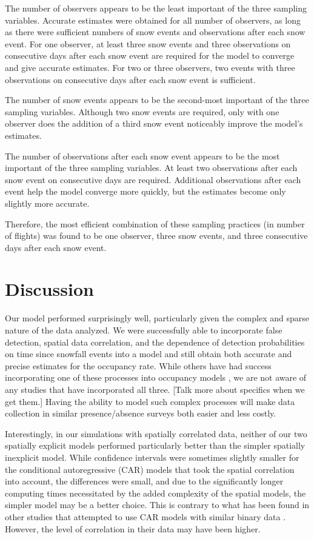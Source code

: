 \documentclass[11pt]{article}
\begin{document}
    The number of observers appears to be the least important of the three
    sampling variables.  Accurate estimates were obtained for all number of
    observers, as long as there were sufficient numbers of snow events and
    observations after each snow event.  For one observer, at least three snow
    events and three observations on consecutive days after each snow event are
    required for the model to converge and give accurate estimates.  For two or
    three observers, two events with three observations on consecutive days
    after each snow event is sufficient.

    The number of snow events appears to be the second-most important of the
    three sampling variables.  Although two snow events are required, only with
    one observer does the addition of a third snow event noticeably improve the
    model's estimates.

    The number of observations after each snow event appears to be the most
    important of the three sampling variables.  At least two observations after
    each snow event on consecutive days are required.  Additional observations
    after each event help the model converge more quickly, but the estimates
    become only slightly more accurate.

    Therefore, the most efficient combination of these sampling practices (in
    number of flights)  was found to be one observer, three snow events, and
    three consecutive days after each snow event.

\section{Discussion}

Our model performed surprisingly well, particularly given the complex and
sparse nature of the data analyzed. We were successfully able to incorporate
false detection, spatial data correlation, and the dependence of detection
probabilities on time since snowfall events into a model and still obtain both
accurate and precise estimates for the occupancy rate. While others have had
success incorporating one of these processes into occupancy models
\citep{Magoun2007, Royle2006, Stanley2005}, we are not aware of any studies
that have incorporated all three. [Talk more about specifics when we get them.]
Having the ability to model such complex processes will make data collection in
similar presence/absence surveys both easier and less costly.

Interestingly, in our simulations with spatially correlated data, neither of
our two spatially explicit models performed particularly better than the
simpler spatially inexplicit model. While confidence intervals were sometimes
slightly smaller for the conditional autoregressive (CAR) models that took the
spatial correlation into account, the differences were small, and due to the
significantly longer computing times necessitated by the added complexity of
the spatial models, the simpler model may be a better choice. This is contrary
to what has been found in other studies that attempted to use CAR models with
similar binary data \citep{Wintle2006}. However, the level of correlation in
their data may have been higher.
\end{document}
